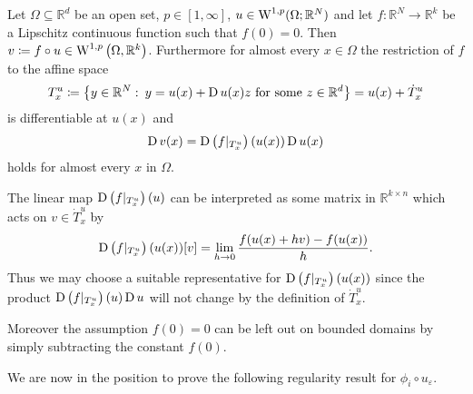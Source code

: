 \begin{theorem}
	\label{chain_rule_for_distributional_derivatives}
	Let $ \Omega \subseteq \mathbb{ R }^{ d } $ be an open set, $ p \in [1, 
	\infty ] $, $ u \in \operatorname{W}^{ 1, p } ( \Omega ; \mathbb{ R }^{ N } ) $ and let 
	$ f \colon \mathbb{ R }^{ N } \to \mathbb{ R }^{ k } $ be a Lipschitz 
	continuous function such that $ f ( 0 ) = 0 $. Then $ v \coloneqq f \circ u 
	\in \operatorname{W}^{ 1, p } \left( \Omega , \mathbb{ R }^{ k } \right) $. Furthermore 
	for almost every $ x \in \Omega $ the restriction of $ f $ to the affine 
	space 
	\begin{equation*}
		T_{ x }^{ u }
		\coloneqq
		\left\{
			y \in \mathbb{ R }^{ N }
			\, \colon \,
			y = u ( x ) + \operatorname{D} u ( x ) z 
			\text{ for some }
			z \in \mathbb{ R }^{ d }
		\right\}
		=
		u( x ) 
		+
		\dot{ T }_{ x }^{ u }
	\end{equation*}
	is differentiable at $ u( x ) $ and
	\begin{equation*}
		\operatorname{D} v ( x )
		=
		\operatorname{D} \left(
			f |_{ T_{ x }^{ u } }
		\right) ( u ( x ) ) 
		\operatorname{D} u ( x )
	\end{equation*}
	holds for almost every $ x $ in $ \Omega $.
\end{theorem}
\begin{remark}
	The linear map
	$\operatorname{D} \left(
	f |_{ T_{ x }^{ u } }
	\right) ( u ) 
	$
	can be interpreted as some matrix in $ \mathbb{ R }^{ k \times n } $ which acts on $ v \in \dot{ T }_{ x }^{ u } $ by
	\begin{equation*}
		\operatorname{D} \left(
		f |_{ T_{ x }^{ u } }
		\right) ( u ( x ) ) 
		[ v ]
		=
		\lim_{ h \to 0 }
			\frac{ f ( u ( x ) + h v ) - f ( u ( x ) ) }{ h }.
	\end{equation*}
	Thus we may choose a suitable representative for $ \operatorname{D} \left(
	f |_{ T_{ x }^{ u } }
	\right) ( u ( x ) ) $ since the product $ \operatorname{D} \left(
	f |_{ T_{ x }^{ u } }
	\right) ( u )  
	\operatorname{D} u $
	will not change by the definition of $ \dot{ T }_{ x }^{ u } $.
	
	Moreover the assumption $ f( 0 ) = 0 $ can be left out on bounded domains by simply subtracting the constant $ f( 0 ) $.
\end{remark}

We are now in the position to prove the following regularity result for $ 
\phi_{ i } \circ u_{ \varepsilon } $.

